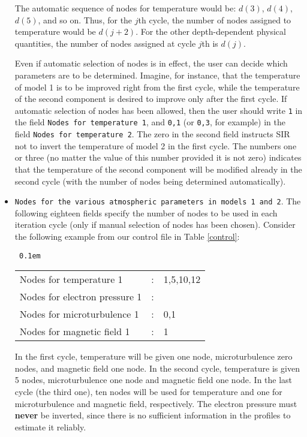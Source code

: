 \begin{itemize}
The automatic sequence of nodes for temperature would be: $d(3)$,
$d(4)$, $d(5)$, and so on. Thus, for the $j$th cycle, the number of
nodes assigned to temperature would be $d(j+2)$. For the other
depth-dependent physical quantities, the number of nodes assigned 
at cycle $j$th is $d(j)$.

Even if automatic selection of nodes is in effect, the user can decide
which parameters are to be determined. Imagine, for instance, that the
temperature of model 1 is to be improved right from the first cycle,
while the temperature of the second component is desired to improve
only after the first cycle. If automatic selection of nodes has been
allowed, then the user should write {\tt 1} in the field {\tt Nodes for
temperature 1}, and {\tt 0,1} (or {\tt 0,3}, for example) in the field
{\tt Nodes for temperature 2}. The zero in the second field instructs
SIR not to invert the temperature of model 2 in the first cycle. The
numbers one or three (no matter the value of this number provided it is
not zero) indicates that the temperature of the second component will
be modified already in the second cycle (with the number of nodes being
determined automatically).

\item {\tt Nodes for the various atmospheric parameters in models 1 and 2}. The
following eighteen fields specify the number of nodes to be 
used in each iteration cycle (only if manual selection of nodes has
been chosen). Consider the following example from our control file in
Table \ref{control}:
\begin{flushleft}
\tt 
\tabcolsep 0.1em
\begin{tabular}{lcl}
Nodes for temperature 1    &:&1,5,10,12         \\
Nodes for electron pressure 1 &:&                  \\
Nodes for microturbulence 1     &:&0,1               \\
Nodes for magnetic field 1 &:&1	
\end{tabular}
\end{flushleft}
In the first cycle, temperature will be given one node, microturbulence
zero nodes, and magnetic field one node. In the second cycle,
temperature is given 5 nodes, microturbulence one node and magnetic
field one node. In the last cycle (the third one), ten nodes will be
used for temperature and one for microturbulence and magnetic field,
respectively. The electron pressure must {\bf never} be inverted, since 
there is no sufficient information in the profiles to estimate it 
reliably. 


\end{itemize}
